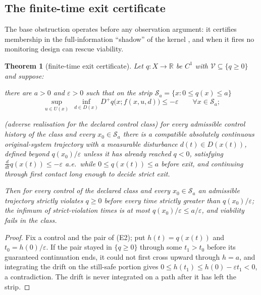 \documentclass[11pt,a4paper]{article}
\theoremstyle{plain}
\newtheorem{theorem}{Theorem}[section]
\theoremstyle{definition}
\theoremstyle{remark}
\newcommand{\R}{\mathbb{R}}
\newcommand{\cV}{\mathcal{V}}
\newcommand{\cS}{\mathcal{S}}
\newcommand{\hyp}[1]{\textup{(#1)}}
\begin{document}
\subsection{The finite-time exit certificate}\label{sec:exit}

The base obstruction operates before any observation argument: it certifies membership in the full-information ``shadow'' of the kernel \citep{aubin2001,aubin2002}, and when it fires no monitoring design can rescue viability.

\begin{theorem}[finite-time exit certificate]\label{thm:exit}
Let $q:X\to\R$ be $C^1$ with $\cV\subseteq\{q\ge0\}$ and suppose:
\begin{description}[leftmargin=2.6em,itemsep=1pt]
\item[\hyp{E1}] there are $a>0$ and $\varepsilon>0$ such that on the strip $\cS_a=\{x:0\le q(x)\le a\}$
\begin{equation}\label{eq:isaacs}
\sup_{u\in U(x)}\ \inf_{d\in D(x)}D^+q\bigl(x;f(x,u,d)\bigr)\le-\varepsilon\qquad\forall x\in\cS_a;
\end{equation}
\item[\hyp{E2}] (\emph{adverse realisation for the declared control class}) for every admissible control history of the class and every $x_0\in\cS_a$ there is a compatible absolutely continuous original-system trajectory with a measurable disturbance $d(t)\in D(x(t))$, defined beyond $q(x_0)/\varepsilon$ unless it has already reached $q<0$, satisfying $\frac{d}{dt}q(x(t))\le-\varepsilon$ a.e.\ while $0\le q(x(t))\le a$ before exit, and continuing through first contact long enough to decide strict exit.
\end{description}
Then for every control of the declared class and every $x_0\in\cS_a$ an admissible trajectory strictly violates $q\ge0$ before every time strictly greater than $q(x_0)/\varepsilon$; the infimum of strict-violation times is at most $q(x_0)/\varepsilon\le a/\varepsilon$, and viability fails in the class.
\end{theorem}

\begin{proof}
Fix a control and the pair of \hyp{E2}; put $h(t)=q(x(t))$ and $t_0=h(0)/\varepsilon$. If the pair stayed in $\{q\ge0\}$ through some $t_1>t_0$ before its guaranteed continuation ends, it could not first cross upward through $h=a$, and integrating the drift on the still-safe portion gives $0\le h(t_1)\le h(0)-\varepsilon t_1<0$, a contradiction. The drift is never integrated on a path after it has left the strip.
\end{proof}
\end{document}
